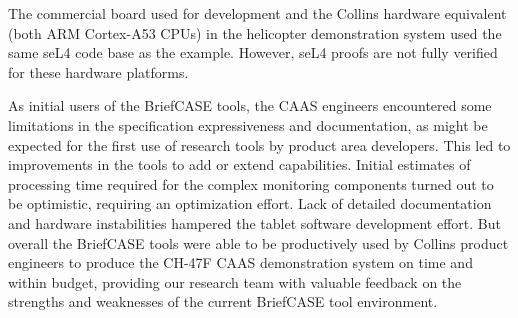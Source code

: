 The commercial board used for development and the Collins hardware equivalent (both ARM Cortex-A53 CPUs)
in the helicopter demonstration system used the same seL4 code base as the  example.  
However, seL4 proofs are not fully verified for these hardware platforms.  

As initial users of the BriefCASE tools, the CAAS engineers encountered some limitations in the
specification expressiveness and documentation, as might be
expected for the first use of research tools by product area developers. 
This led to improvements in the tools to add or extend capabilities.  Initial estimates of
processing time required for the complex monitoring components turned out to be optimistic,
requiring an optimization effort. Lack of detailed documentation and hardware instabilities 
hampered the tablet software development effort. But overall the BriefCASE tools were able
to be productively used by Collins product engineers to produce the CH-47F CAAS demonstration
system on time and within budget, providing our research team with valuable feedback on the
strengths and weaknesses of the current BriefCASE tool environment.
